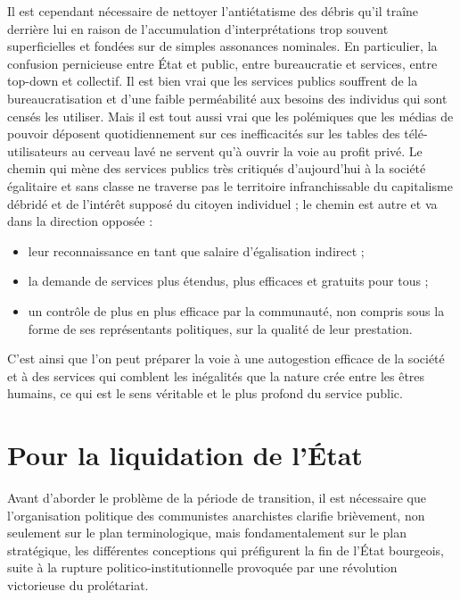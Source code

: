 Il est cependant nécessaire de nettoyer l'antiétatisme des débris qu'il traîne derrière lui en raison de l'accumulation d'interprétations trop souvent superficielles et fondées sur de simples assonances nominales. En particulier, la confusion pernicieuse entre État et public, entre bureaucratie et services, entre top-down et collectif. Il est bien vrai que les services publics souffrent de la bureaucratisation et d'une faible perméabilité aux besoins des individus qui sont censés les utiliser. Mais il est tout aussi vrai que les polémiques que les médias de pouvoir déposent quotidiennement sur ces inefficacités sur les tables des télé-utilisateurs au cerveau lavé ne servent qu'à ouvrir la voie au profit privé. Le chemin qui mène des services publics très critiqués d'aujourd'hui à la société égalitaire et sans classe ne traverse pas le territoire infranchissable du capitalisme débridé et de l'intérêt supposé du citoyen individuel ; le chemin est autre et va dans la direction opposée :

\begin{itemize}
\item leur reconnaissance en tant que salaire d'égalisation indirect ;
\item la demande de services plus étendus, plus efficaces et gratuits pour tous ;
\item un contrôle de plus en plus efficace par la communauté, non compris sous la forme de ses représentants politiques, sur la qualité de leur prestation.
\end{itemize}

C'est ainsi que l'on peut préparer la voie à une autogestion efficace de la société et à des services qui comblent les inégalités que la nature crée entre les êtres humains, ce qui est le sens véritable et le plus profond du service public.

\chapter{Pour la liquidation de l'État}

Avant d'aborder le problème de la période de transition, il est nécessaire que l'organisation politique des communistes anarchistes clarifie brièvement, non seulement sur le plan terminologique, mais fondamentalement sur le plan stratégique, les différentes conceptions qui préfigurent la fin de l'État bourgeois, suite à la rupture politico-institutionnelle provoquée par une révolution victorieuse du prolétariat.

